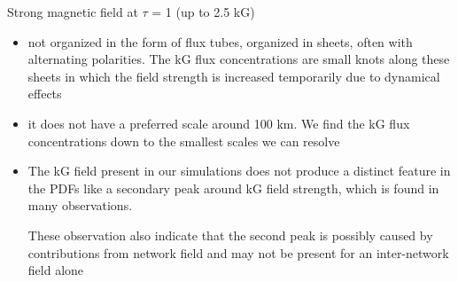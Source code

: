 \documentclass{beamer}
\begin{document}
\begin{frame}{Strong magnetic field at $\tau$ = 1 (up to 2.5 kG)}

\begin{itemize}

\item not organized
in the form of flux tubes, organized in sheets, often with alternating polarities. The kG flux
concentrations are small knots along these sheets in which the
field strength is increased temporarily due to dynamical effects
\item it does not have a preferred
scale around 100 km.  We find the kG flux concentrations down to the smallest scales
we can resolve 
\item The kG field present in our simulations does
not produce a distinct feature in the PDFs like a secondary peak
around kG field strength, which is found in many observations.

These observation also indicate that the second
peak is possibly caused by contributions from network field and
may not be present for an inter-network field alone
 
\end{itemize}
\end{frame}
\end{document}
